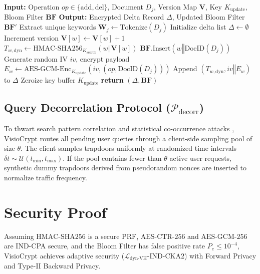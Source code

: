 \documentclass[runningheads]{llncs}
\begin{document}
\begin{algorithm}[t]
\caption{VisioCrypt Dynamic Incremental Update ($\text{Update}$)}\label{alg:update}
\begin{algorithmic}[1]
\Statex \textbf{Input:} Operation $op \in \{\text{add}, \text{del}\}$, Document $D_j$, Version Map $\mathbf{V}$, Key $K_{\text{update}}$, Bloom Filter $\mathbf{BF}$
\Statex \textbf{Output:} Encrypted Delta Record $\Delta$, Updated Bloom Filter $\mathbf{BF}'$
\State Extract unique keywords $\mathbf{W}_j \leftarrow \text{Tokenize}(D_j)$
\State Initialize delta list $\Delta \leftarrow \emptyset$
    \State Increment version $\mathbf{V}[w] \leftarrow \mathbf{V}[w] + 1$
    \State $T_{w,\text{dyn}} \leftarrow \text{HMAC-SHA256}_{K_{\text{search}}}(w \mathbin{\Vert} \mathbf{V}[w])$
        \State $\mathbf{BF}.\text{Insert}(w \mathbin{\Vert} \text{DocID}(D_j))$
    \EndIf
    \State Generate random IV $iv$, encrypt payload $E_w \leftarrow \text{AES-GCM-Enc}_{K_{\text{update}}}(iv, (op, \text{DocID}(D_j)))$
    \State Append $(T_{w,\text{dyn}}, iv \mathbin{\Vert} E_w)$ to $\Delta$
\EndFor
\State Zeroize key buffer $K_{\text{update}}$
\State \textbf{return} $(\Delta, \mathbf{BF})$
\end{algorithmic}
\end{algorithm}

\subsection{Query Decorrelation Protocol ($\mathcal{P}_{\text{decorr}}$)}
To thwart search pattern correlation and statistical co-occurrence attacks \cite{swat2024}, VisioCrypt routes all pending user queries through a client-side sampling pool of size $\theta$. The client samples trapdoors uniformly at randomized time intervals $\delta t \sim \mathcal{U}(t_{\min}, t_{\max})$. If the pool contains fewer than $\theta$ active user requests, synthetic dummy trapdoors derived from pseudorandom nonces are inserted to normalize traffic frequency.

\section{Security Proof}

\begin{theorem}
Assuming $\text{HMAC-SHA256}$ is a secure PRF, $\text{AES-CTR-256}$ and $\text{AES-GCM-256}$ are IND-CPA secure, and the Bloom Filter has false positive rate $P_e \leq 10^{-4}$, VisioCrypt achieves adaptive security ($\mathcal{L}_{\text{dyn-VH}}\text{-IND-CKA2}$) with Forward Privacy and Type-II Backward Privacy.
\end{theorem}
\end{document}

